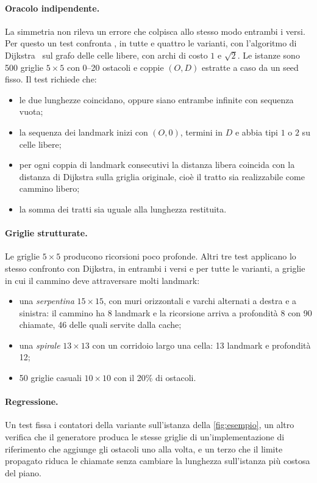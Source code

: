 \paragraph{Oracolo indipendente.} La simmetria non rileva un errore che
colpisca allo stesso modo entrambi i versi. Per questo un test confronta
\cmin{}, in tutte e quattro le varianti, con l'algoritmo di
Dijkstra~\cite{dijkstra} sul grafo delle celle libere, con archi di costo
$1$ e $\sqrt{2}$. Le istanze sono 500 griglie $5\times5$ con 0--20 ostacoli
e coppie $(O,D)$ estratte a caso da un seed fisso. Il test richiede che:

\begin{itemize}
  \item le due lunghezze coincidano, oppure siano entrambe infinite con
        sequenza vuota;
  \item la sequenza dei landmark inizi con $(O,0)$, termini in $D$ e abbia
        tipi $1$ o $2$ su celle libere;
  \item per ogni coppia di landmark consecutivi la distanza libera coincida
        con la distanza di Dijkstra sulla griglia originale, cioè il tratto
        sia realizzabile come cammino libero;
  \item la somma dei tratti sia uguale alla lunghezza restituita.
\end{itemize}

\paragraph{Griglie strutturate.} Le griglie $5\times5$ producono ricorsioni
poco profonde. Altri tre test applicano lo stesso confronto con Dijkstra, in
entrambi i versi e per tutte le varianti, a griglie in cui il cammino deve
attraversare molti landmark:

\begin{itemize}
  \item una \emph{serpentina} $15\times15$, con muri orizzontali e varchi
        alternati a destra e a sinistra: il cammino ha 8 landmark e la
        ricorsione arriva a profondità 8 con 90 chiamate, 46 delle quali
        servite dalla cache;
  \item una \emph{spirale} $13\times13$ con un corridoio largo una cella:
        13 landmark e profondità 12;
  \item 50 griglie casuali $10\times10$ con il 20\% di ostacoli.
\end{itemize}

\paragraph{Regressione.} Un test fissa i contatori della variante
 sull'istanza della \cref{fig:esempio}, un altro verifica che il
generatore produca le stesse griglie di un'implementazione di riferimento
che aggiunge gli ostacoli uno alla volta, e un terzo
che il limite propagato riduca le chiamate senza cambiare la lunghezza
sull'istanza più costosa del piano.

